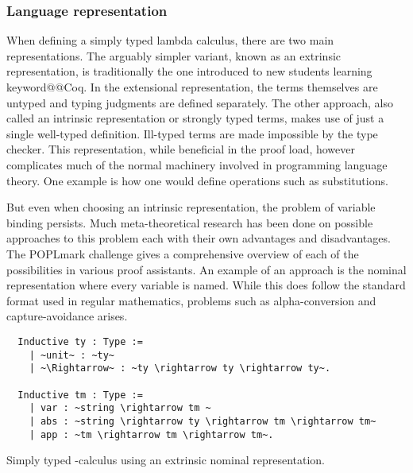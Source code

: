 \documentclass[12pt, final]{article}
\makeatletter
\def\<#1>{\csname keyword@@#1\endcsname}
\makeatother
\begin{document}
\subsubsection{Language representation}

When defining a simply typed lambda calculus, there are two main representations\cite{plfa2019}.
The arguably simpler variant, known as an extrinsic representation, is traditionally the one introduced to new students learning \<Coq>.
In the extensional representation, the terms themselves are untyped and typing judgments are defined separately.
The other approach, also called an intrinsic representation or strongly typed terms, makes use of just a single well-typed definition.
Ill-typed terms are made impossible by the type checker.
This representation, while beneficial in the proof load, however complicates much of the normal machinery involved in programming language theory.
One example is how one would define operations such as substitutions.

But even when choosing an intrinsic representation, the problem of variable binding persists.
Much meta-theoretical research has been done on possible approaches to this problem each with their own advantages and disadvantages.
The POPLmark challenge gives a comprehensive overview of each of the possibilities in various proof assistants\cite{Aydemir2005}.
An example of an approach is the nominal representation where every variable is named.
While this does follow the standard format used in regular mathematics, problems such as alpha-conversion and capture-avoidance arises.

\begin{listing}
  \begin{verbatim}
  Inductive ty : Type :=
    | ~unit~ : ~ty~
    | ~\Rightarrow~ : ~ty \rightarrow ty \rightarrow ty~.

  Inductive tm : Type :=
    | var : ~string \rightarrow tm ~
    | abs : ~string \rightarrow ty \rightarrow tm \rightarrow tm~
    | app : ~tm \rightarrow tm \rightarrow tm~.
  \end{verbatim}
  \caption{Simply typed \lambda-calculus using an extrinsic nominal representation.}
  \label{lst:nominal_stlc}
\end{listing}
\end{document}
